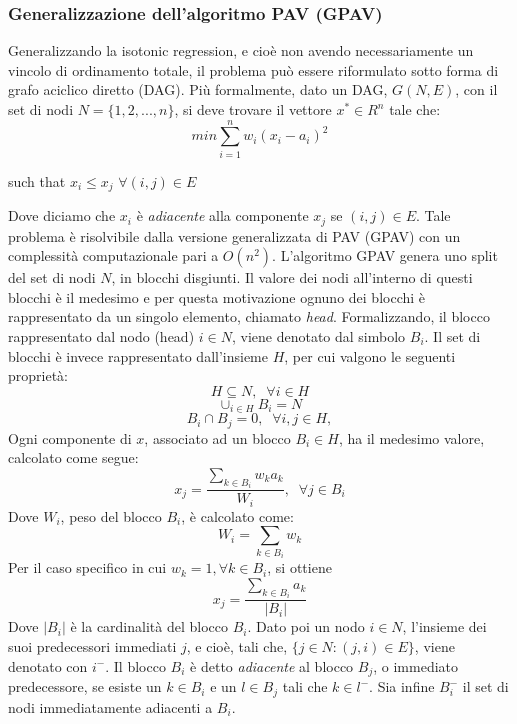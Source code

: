 \documentclass[12pt]{report}
\begin{document}
\subsubsection{Generalizzazione dell'algoritmo PAV (GPAV)}
Generalizzando la isotonic regression, e cioè non avendo necessariamente un vincolo di ordinamento totale, il problema può essere riformulato sotto forma di grafo aciclico diretto (DAG). Più formalmente, dato un DAG, $G(N, E)$, con il set di nodi $N = \{1, 2, ..., n\}$, si deve trovare il vettore $x^{*}\in R^{n}$ tale che:
\[
min \sum_{i=1}^{n} w_i (x_i - a_i)^2
\]
\begin{center}
such that $x_i \le x_j$ $\forall (i,j) \in E $ 
\end{center}
Dove diciamo che $x_i$ è \emph{adiacente} alla componente $x_j$ se $(i, j)\in E$.
\newline
\newline
Tale problema è risolvibile dalla versione generalizzata di PAV (GPAV) con un complessità computazionale pari a $O(n^2)$\cite{GPAV}.
\newline
\newline
L'algoritmo GPAV genera uno split del set di nodi $N$, in blocchi disgiunti. Il valore dei nodi all'interno di questi blocchi è il medesimo e per questa motivazione ognuno dei blocchi è rappresentato da un singolo elemento, chiamato \emph{head}. Formalizzando, il blocco rappresentato dal nodo (head) $i\in N$, viene denotato dal simbolo $B_i$. Il set di blocchi è invece rappresentato dall'insieme $H$, per cui valgono le seguenti proprietà:
\[
H  \subseteq N,\;\; \forall i \in H
\]
\[
\cup_{i\in H}B_i = N
\]
\[
B_i \cap B_j = 0, \;\; \forall i,j \in H,
\]
Ogni componente di $x$, associato ad un blocco $B_i \in H$, ha il medesimo valore, calcolato come segue:
\[
x_j = \frac{\sum_{k \in B_{i}} w_k a_k }{W_i}, \;\; \forall j \in B_i
\]
Dove $W_i$, peso del blocco $B_i$, è calcolato come:
\[
W_i = \sum_{k \in B_i} w_k
\]
Per il caso specifico in cui $w_k = 1, \forall k \in B_i$, si ottiene 
\[
x_j = \frac{\sum_{k\in B_i} a_k}{|B_i|}
\]
Dove $|B_i|$ è la cardinalità del blocco $B_i$.
\newline
\newline
Dato poi un nodo $i\in N$, l'insieme dei suoi  predecessori immediati $j$, e cioè, tali che, $\{j \in N :(j, i) \in E\} $, viene denotato con $i^{-}$. Il blocco $B_i$  è detto \emph{adiacente} al blocco $B_j$, o immediato predecessore, se esiste un $k \in B_i $ e un $l \in B_j$ tali che $k \in l^{-}$. Sia infine $B_i^{-}$ il set di nodi immediatamente adiacenti a $B_i$. 
\end{document}
